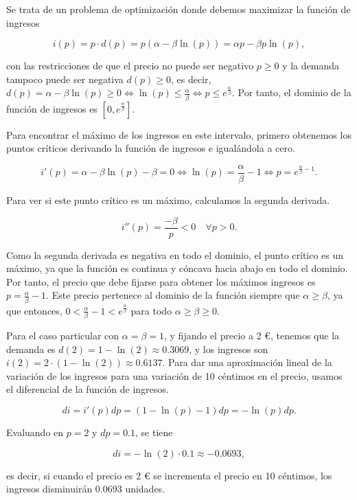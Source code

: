 \documentclass[
  spanish,
  a4paper,
]{scrreport}
\theoremstyle{definition}
\theoremstyle{remark}
\begin{document}
\begin{tcolorbox}[enhanced jigsaw, arc=.35mm, bottomrule=.15mm, bottomtitle=1mm, breakable, colback=white, colbacktitle=quarto-callout-tip-color!10!white, colframe=quarto-callout-tip-color-frame, coltitle=black, left=2mm, leftrule=.75mm, opacityback=0, opacitybacktitle=0.6, rightrule=.15mm, title=\textcolor{quarto-callout-tip-color}{\faLightbulb}\hspace{0.5em}{Solución}, titlerule=0mm, toprule=.15mm, toptitle=1mm]

Se trata de un problema de optimización donde debemos maximizar la
función de ingresos

\[
i(p) = p\cdot d(p)
= p(\alpha - \beta \ln(p)) = \alpha p - \beta p\ln(p),
\]

con las restricciones de que el precio no puede ser negativo \(p\geq 0\)
y la demanda tampoco puede ser negativa \(d(p)\geq 0\), es decir,
\(d(p) = \alpha - \beta \ln(p) \geq 0 \Leftrightarrow \ln(p) \leq \frac{\alpha}{\beta} \Leftrightarrow p \leq e^{\frac{\alpha}{\beta}}\).
Por tanto, el dominio de la función de ingresos es
\([0, e^{\frac{\alpha}{\beta}}]\).

Para encontrar el máximo de los ingresos en este intervalo, primero
obtenemos los puntos críticos derivando la función de ingresos e
igualándola a cero.

\[
i'(p) 
= \alpha - \beta \ln(p) - \beta = 0
\Leftrightarrow \ln(p) = \frac{\alpha}{\beta} - 1
\Leftrightarrow p = e^{\frac{\alpha}{\beta} - 1}.
\]

Para ver si este punto crítico es un máximo, calculamos la segunda
derivada.

\[
i''(p) =  \frac{-\beta}{p} < 0 \quad \forall p > 0.
\]

Como la segunda derivada es negativa en todo el dominio, el punto
crítico es un máximo, ya que la función es continua y cóncava hacia
abajo en todo el dominio. Por tanto, el precio que debe fijarse para
obtener los máximos ingresos es \(p = \frac{\alpha}{\beta} - 1\). Este
precio pertenece al dominio de la función siempre que
\(\alpha\geq \beta\), ya que entonces,
\(0 < \frac{\alpha}{\beta} - 1 < e^{\frac{\alpha}{\beta}}\) para todo
\(\alpha\geq \beta \geq 0\).

Para el caso particular con \(\alpha = \beta = 1\), y fijando el precio
a 2 €, tenemos que la demanda es \(d(2) = 1 - \ln(2) \approx 0.3069\), y
los ingresos son \(i(2) = 2 \cdot (1 - \ln(2)) \approx 0.6137\). Para
dar una aproximación lineal de la variación de los ingresos para una
variación de 10 céntimos en el precio, usamos el diferencial de la
función de ingresos.

\[
di = i'(p) dp 
= (1 - \ln(p) - 1) dp
= -\ln(p) dp.
\]

Evaluando en \(p=2\) y \(dp = 0.1\), se tiene

\[
di = -\ln(2) \cdot 0.1 \approx -0.0693,
\]

es decir, si cuando el precio es 2 € se incrementa el precio en 10
céntimos, los ingresos disminuirán 0.0693 unidades.

\end{tcolorbox}
\end{document}
